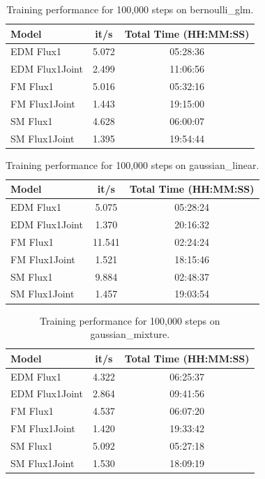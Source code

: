 \begin{table}[htbp]
  \centering
  \begin{tabular}{l c c}
    \toprule
    Model & it/s & Total Time (HH:MM:SS) \\
    \midrule
    EDM Flux1 & 5.072 & 05:28:36 \\
    EDM Flux1Joint & 2.499 & 11:06:56 \\
    FM Flux1 & 5.016 & 05:32:16 \\
    FM Flux1Joint & 1.443 & 19:15:00 \\
    SM Flux1 & 4.628 & 06:00:07 \\
    SM Flux1Joint & 1.395 & 19:54:44 \\
    \bottomrule
  \end{tabular}
  \caption{Training performance for 100,000 steps on bernoulli\_glm.}
  \label{tab:training_times_bernoulli_glm}
\end{table}


\begin{table}[htbp]
  \centering
  \begin{tabular}{l c c}
    \toprule
    Model & it/s & Total Time (HH:MM:SS) \\
    \midrule
    EDM Flux1 & 5.075 & 05:28:24 \\
    EDM Flux1Joint & 1.370 & 20:16:32 \\
    FM Flux1 & 11.541 & 02:24:24 \\
    FM Flux1Joint & 1.521 & 18:15:46 \\
    SM Flux1 & 9.884 & 02:48:37 \\
    SM Flux1Joint & 1.457 & 19:03:54 \\
    \bottomrule
  \end{tabular}
  \caption{Training performance for 100,000 steps on gaussian\_linear.}
  \label{tab:training_times_gaussian_linear}
\end{table}


\begin{table}[htbp]
  \centering
  \begin{tabular}{l c c}
    \toprule
    Model & it/s & Total Time (HH:MM:SS) \\
    \midrule
    EDM Flux1 & 4.322 & 06:25:37 \\
    EDM Flux1Joint & 2.864 & 09:41:56 \\
    FM Flux1 & 4.537 & 06:07:20 \\
    FM Flux1Joint & 1.420 & 19:33:42 \\
    SM Flux1 & 5.092 & 05:27:18 \\
    SM Flux1Joint & 1.530 & 18:09:19 \\
    \bottomrule
  \end{tabular}
  \caption{Training performance for 100,000 steps on gaussian\_mixture.}
  \label{tab:training_times_gaussian_mixture}
\end{table}


